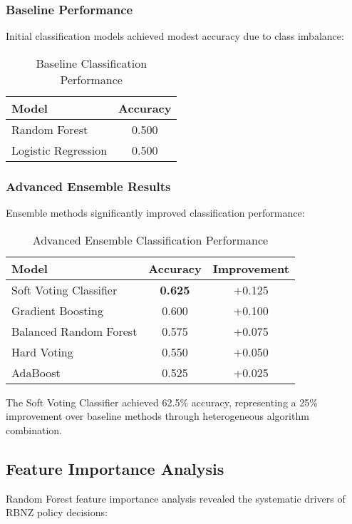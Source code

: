 \documentclass[11pt,a4paper]{article}
\begin{document}
	\subsubsection{Baseline Performance}
	Initial classification models achieved modest accuracy due to class imbalance:
	
	\begin{table}[H]
		\centering
		\caption{Baseline Classification Performance}
		\begin{tabular}{lc}
			\toprule
			Model & Accuracy \\
			\midrule
			Random Forest & 0.500 \\
			Logistic Regression & 0.500 \\
			\bottomrule
		\end{tabular}
	\end{table}
	
	\subsubsection{Advanced Ensemble Results}
	Ensemble methods significantly improved classification performance:
	
	\begin{table}[H]
		\centering
		\caption{Advanced Ensemble Classification Performance}
		\begin{tabular}{lcc}
			\toprule
			Model & Accuracy & Improvement \\
			\midrule
			Soft Voting Classifier & \textbf{0.625} & +0.125 \\
			Gradient Boosting & 0.600 & +0.100 \\
			Balanced Random Forest & 0.575 & +0.075 \\
			Hard Voting & 0.550 & +0.050 \\
			AdaBoost & 0.525 & +0.025 \\
			\bottomrule
		\end{tabular}
	\end{table}
	
	The Soft Voting Classifier achieved 62.5\% accuracy, representing a 25\% improvement over baseline methods through heterogeneous algorithm combination.
	
	\subsection{Feature Importance Analysis}
	
	Random Forest feature importance analysis revealed the systematic drivers of RBNZ policy decisions:
	
\end{document}
